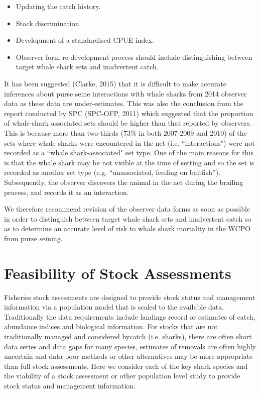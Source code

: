 \documentclass[12pt]{SCreport}
\begin{document}
\begin{itemize}
\item{} Updating the catch history.
\item{} Stock discrimination.
\item{} Development of a standardised CPUE index.
\item{} Observer form re-development process should include distinguishing between target whale shark sets and inadvertent catch.
\end{itemize}

It has been suggested (Clarke, 2015) that it is difficult to make accurate inferences about purse seine interactions with whale sharks from 2014 observer data as these data are under-estimates.  This was also the conclusion from the report conducted by SPC (SPC-OFP, 2011) which suggested that the proportion of whale-shark associated sets should be higher than that reported by observers. This is because more than two-thirds (73\% in both 2007-2009 and 2010) of the sets where whale sharks were encountered in the net (i.e. ``interactions") were not recorded as a ``whale shark-associated" set type.  One of the main reasons for this is that the whale shark may be not visible at the time of setting and so the set is recorded as another set type (e.g. ``unassociated, feeding on baitfish''). Subsequently, the observer discovers the animal in the net during the brailing process, and records it as an interaction. 

We therefore recommend revision of the observer data forms as soon as possible in order to distinguish between target whale shark sets and inadvertent catch so as to determine an accurate level of risk to whale shark mortality in the WCPO from purse seining.
  
  
  
      
\section{Feasibility of Stock Assessments}

Fisheries stock assessments are designed to provide stock status and management information via a population model that is scaled to the available data. Traditionally the data requirements include landings record or estimates of catch, abundance indices and biological information. For stocks that are not traditionally managed and considered bycatch (i.e. sharks), there are often short data series and data gaps for many species, estimates of removals are often highly uncertain and data poor methods or other alternatives may be more appropriate than full stock assessments. Here we consider each of the key shark species and the viability of a stock assessment or other population level study to provide stock status and management information.
\end{document}
